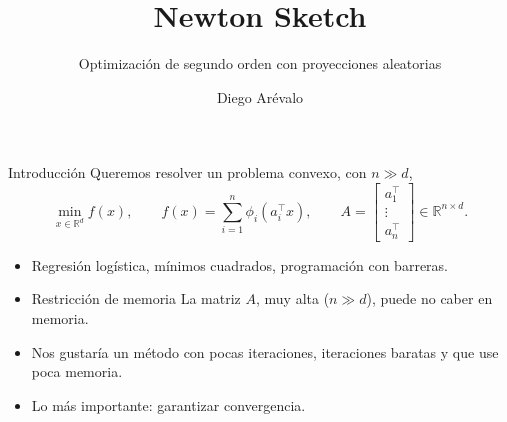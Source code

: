 \documentclass[aspectratio=169,11pt]{beamer}
\title{Newton Sketch}
\subtitle{Optimización de segundo orden con proyecciones aleatorias}
\author{Diego Arévalo}
\institute{Optimización Numérica y Álgebra Lineal Numérica}
\date{}
\newcommand{\R}{\mathbb{R}}
\begin{document}
\begin{frame}
  \titlepage
\end{frame}

\begin{frame}{Introducción}
  Queremos resolver un problema convexo, con $n \gg d$,
  \[
    \min_{x\in\R^d} f(x), \qquad f(x)=\sum_{i=1}^{n}\phi_i(a_i^\top x),
    \qquad A=\begin{bmatrix}a_1^\top\\ \vdots\\ a_n^\top\end{bmatrix}\in\R^{n\times d}.
  \]
  \vspace{-4pt}
  \begin{itemize}
    \item Regresión logística, mínimos cuadrados, programación con barreras.
    \pause
    \item[] \begin{alertblock}{Restricción de memoria}
      La matriz $A$, muy alta ($n\gg d$), puede no caber en memoria.
    \end{alertblock}
    \pause
    \item Nos gustaría un método con \alert{pocas iteraciones}, \alert{iteraciones baratas} y que \alert{use poca memoria}.
    \item Lo más importante: \alert{garantizar convergencia}.
  \end{itemize}
\end{frame}
\end{document}

